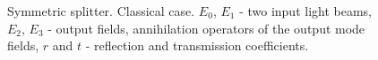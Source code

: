 \begin{figure}
\centering



\caption{Symmetric splitter. Classical case.
  $E_0$, $E_1$ - two input light beams,
  $E_2$, $E_3$ - output fields, annihilation operators 
  of the output mode fields, $r$ and $t$ - reflection and transmission coefficients.}
\label{figPart2Interfero_1ex}
\end{figure}